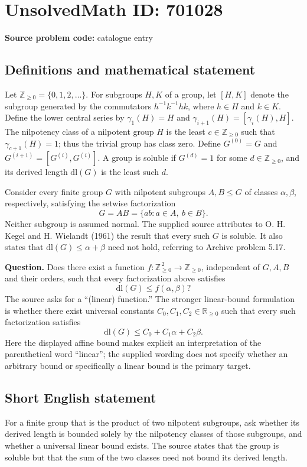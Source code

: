 \documentclass[11pt]{article}
\newcommand{\Z}{\mathbb{Z}}
\newcommand{\R}{\mathbb{R}}
\begin{document}
\section*{UnsolvedMath ID: 701028}
\textbf{Source problem code:} catalogue entry
\subsection{Definitions and mathematical statement}
Let \(\Z_{\ge 0}=\{0,1,2,\ldots\}\). For subgroups \(H,K\) of a group, let \([H,K]\) denote the subgroup generated by the commutators \(h^{-1}k^{-1}hk\), where \(h\in H\) and \(k\in K\). Define the lower central series by \(\gamma_1(H)=H\) and \(\gamma_{i+1}(H)=[\gamma_i(H),H]\). The nilpotency class of a nilpotent group \(H\) is the least \(c\in\Z_{\ge0}\) such that \(\gamma_{c+1}(H)=1\); thus the trivial group has class zero. Define \(G^{(0)}=G\) and \(G^{(i+1)}=[G^{(i)},G^{(i)}]\). A group is soluble if \(G^{(d)}=1\) for some \(d\in\Z_{\ge0}\), and its derived length \(\mathrm{dl}(G)\) is the least such \(d\).

Consider every finite group \(G\) with nilpotent subgroups \(A,B\le G\) of classes \(\alpha,\beta\), respectively, satisfying the setwise factorization
\[
G=AB=\{ab:a\in A,\ b\in B\}.
\]
Neither subgroup is assumed normal. The supplied source attributes to O. H. Kegel and H. Wielandt (1961) the result that every such \(G\) is soluble. It also states that \(\mathrm{dl}(G)\le\alpha+\beta\) need not hold, referring to Archive problem 5.17.

\textbf{Question.} Does there exist a function \(f:\Z_{\ge0}^{\,2}\to\Z_{\ge0}\), independent of \(G,A,B\) and their orders, such that every factorization above satisfies
\[
\mathrm{dl}(G)\le f(\alpha,\beta)?
\]
The source asks for a ``(linear) function.'' The stronger linear-bound formulation is whether there exist universal constants \(C_0,C_1,C_2\in\R_{\ge0}\) such that every such factorization satisfies
\[
\mathrm{dl}(G)\le C_0+C_1\alpha+C_2\beta.
\]
Here the displayed affine bound makes explicit an interpretation of the parenthetical word ``linear''; the supplied wording does not specify whether an arbitrary bound or specifically a linear bound is the primary target.
\subsection{Short English statement}
For a finite group that is the product of two nilpotent subgroups, ask whether its derived length is bounded solely by the nilpotency classes of those subgroups, and whether a universal linear bound exists. The source states that the group is soluble but that the sum of the two classes need not bound its derived length.
\end{document}

